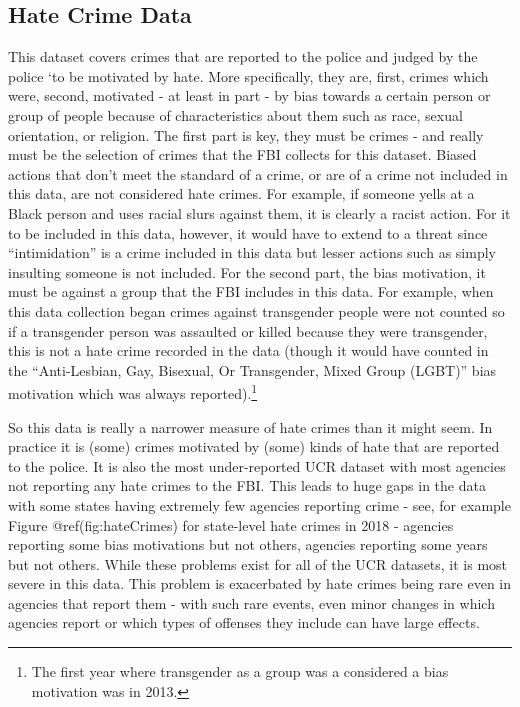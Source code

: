 \documentclass[
  12pt,
  openany]{book}
\begin{document}
\hypertarget{hate-crime-data}{%
\subsection{Hate Crime Data}\label{hate-crime-data}}

This dataset covers crimes that are reported to the police and judged by the police `to be motivated by hate. More specifically, they are, first, crimes which were, second, motivated - at least in part - by bias towards a certain person or group of people because of characteristics about them such as race, sexual orientation, or religion. The first part is key, they must be crimes - and really must be the selection of crimes that the FBI collects for this dataset. Biased actions that don't meet the standard of a crime, or are of a crime not included in this data, are not considered hate crimes. For example, if someone yells at a Black person and uses racial slurs against them, it is clearly a racist action. For it to be included in this data, however, it would have to extend to a threat since ``intimidation'' is a crime included in this data but lesser actions such as simply insulting someone is not included. For the second part, the bias motivation, it must be against a group that the FBI includes in this data. For example, when this data collection began crimes against transgender people were not counted so if a transgender person was assaulted or killed because they were transgender, this is not a hate crime recorded in the data (though it would have counted in the ``Anti-Lesbian, Gay, Bisexual, Or Transgender, Mixed Group (LGBT)'' bias motivation which was always reported).\footnote{The first year where transgender as a group was a considered a bias motivation was in 2013.}

So this data is really a narrower measure of hate crimes than it might seem. In practice it is (some) crimes motivated by (some) kinds of hate that are reported to the police. It is also the most under-reported UCR dataset with most agencies not reporting any hate crimes to the FBI. This leads to huge gaps in the data with some states having extremely few agencies reporting crime - see, for example Figure @ref(fig:hateCrimes) for state-level hate crimes in 2018 - agencies reporting some bias motivations but not others, agencies reporting some years but not others. While these problems exist for all of the UCR datasets, it is most severe in this data. This problem is exacerbated by hate crimes being rare even in agencies that report them - with such rare events, even minor changes in which agencies report or which types of offenses they include can have large effects.
\end{document}
